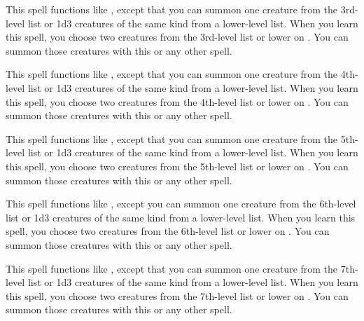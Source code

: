 \spelleffect This spell functions like , except that you can summon one creature from the 3rd-level list or 1d3 creatures of the same kind from a lower-level list. When you learn this spell, you choose two creatures from the 3rd-level list or lower on . You can summon those creatures with this or any other  spell.

\spelleffect This spell functions like , except that you can summon one creature from the 4th-level list or 1d3 creatures of the same kind from a lower-level list. When you learn this spell, you choose two creatures from the 4th-level list or lower on . You can summon those creatures with this or any other  spell.

\spelleffect This spell functions like , except that you can summon one creature from the 5th-level list or 1d3 creatures of the same kind from a lower-level list. When you learn this spell, you choose two creatures from the 5th-level list or lower on . You can summon those creatures with this or any other  spell.

\spelleffect This spell functions like , except you can summon one creature from the 6th-level list or 1d3 creatures of the same kind from a lower-level list. When you learn this spell, you choose two creatures from the 6th-level list or lower on . You can summon those creatures with this or any other  spell.

\spelleffect This spell functions like , except that you can summon one creature from the 7th-level list or 1d3 creatures of the same kind from a lower-level list. When you learn this spell, you choose two creatures from the 7th-level list or lower on . You can summon those creatures with this or any other  spell.

